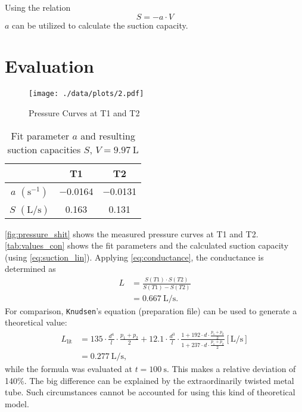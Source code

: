 Using the relation
\begin{equation}\label{eq:suction_lin}
	S=-a\cdot V
\end{equation}
$a$ can be utilized to calculate the suction capacity.

\section{Evaluation}
\begin{figure}[tbp]
	\centering
	\texttt{[image: ./data/plots/2.pdf]}
	\caption[Pressure Curves for T1 and T2]{Pressure Curves at T1 and T2}
	\label{fig:pressure_shit}
\end{figure}
\begin{table}[tbp]
	\centering
	\caption[Fit parameters and suction capacities]{Fit parameter $a$ and resulting suction capacities $S$, $V=\SI{9.97}{\liter}$}
	\label{tab:values_con}
	\begin{tabular}{S|SS}
		\toprule
		{}&	{T1}&	{T2}\\
		\midrule
		{$a$ $(\si{\second}^{-1})$}	&	\num{-0.0164}	&	\num{-0.0131}	\\
		{$S$ $(\si{\liter\per\second})$}	&	0.163	&	0.131	\\
		\bottomrule
	\end{tabular}
\end{table}
\autoref{fig:pressure_shit} shows the measured pressure curves at T1 and T2.
\autoref{tab:values_con} shows the fit parameters and the calculated suction capacity (using \autoref{eq:suction_lin}).
Applying \autoref{eq:conductance}, the conductance is determined as
\begin{align*}
	L &= \frac{S(T1)\cdot S(T2)}{S(T1)-S(T2)} \\
		&= \SI{0.667}{\liter\per\second}.
\end{align*}
For comparison, \texttt{Knudsen}'s equation (preparation file) can be used to generate a theoretical value:
\begin{align*}
	L_\text{lit} &= 135\cdot\frac{d^4}{l}\cdot\frac{p_1+p_2}{2}+\num{12.1}\cdot\frac{d^3}{l}\cdot\frac{1+192\cdot d\cdot\frac{p_1+p_2}{2}}{1+237\cdot d\cdot\frac{p_1+p_2}{2}} \left[\si{\liter\per\second}\right]	\\
	&=\SI{0.277}{\liter\per\second},
\end{align*}
while the formula was evaluated at $t=\SI{100}{\second}$.
This makes a relative deviation of \num{140}\%.
The big difference can be explained by the extraordinarily twisted metal tube.
Such circumstances cannot be accounted for using this kind of theoretical model.
